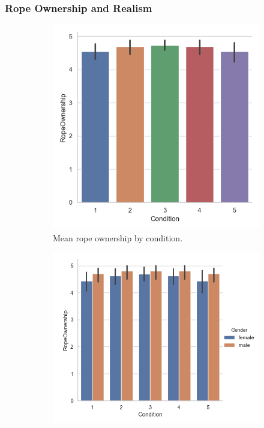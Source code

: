 \subsubsection{Rope Ownership and Realism}
\label{subsubsection:ropeOwnRealism}


\begin{figure}[H]
 \begin{subfigure}[b]{0.5\textwidth}
     \centering
     \includegraphics[scale=0.5]{Files/Plots/ropeOwnership_by_condition.png}
     \caption{Mean rope ownership by condition.}
     \label{fig:ropeOwnCond}
 \end{subfigure}
  \begin{subfigure}[b]{0.5\textwidth}
     \centering
     \includegraphics[scale=0.5]{Files/Plots/ropeOwnership_by_condition_gen.png}

\end{subfigure}
\end{figure}
